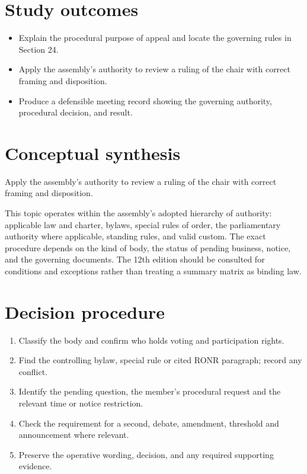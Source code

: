 \documentclass[11pt]{article}
\begin{document}
\SuiteOpen
{}
\section{Study outcomes}
\begin{itemize}[leftmargin=*,itemsep=4pt]
\item Explain the procedural purpose of appeal and locate the governing rules in Section 24.
\item Apply the assembly’s authority to review a ruling of the chair with correct framing and disposition.
\item Produce a defensible meeting record showing the governing authority, procedural decision, and result.
\end{itemize}

\section{Conceptual synthesis}
Apply the assembly’s authority to review a ruling of the chair with correct framing and disposition.

This topic operates within the assembly’s adopted hierarchy of authority: applicable law and charter, bylaws, special rules of order, the parliamentary authority where applicable, standing rules, and valid custom. The exact procedure depends on the kind of body, the status of pending business, notice, and the governing documents. The 12th edition should be consulted for conditions and exceptions rather than treating a summary matrix as binding law.
\section{Decision procedure}
\begin{enumerate}[leftmargin=*,itemsep=4pt]
\item Classify the body and confirm who holds voting and participation rights.
\item Find the controlling bylaw, special rule or cited RONR paragraph; record any conflict.
\item Identify the pending question, the member’s procedural request and the relevant time or notice restriction.
\item Check the requirement for a second, debate, amendment, threshold and announcement where relevant.
\item Preserve the operative wording, decision, and any required supporting evidence.
\end{enumerate}
\end{document}
